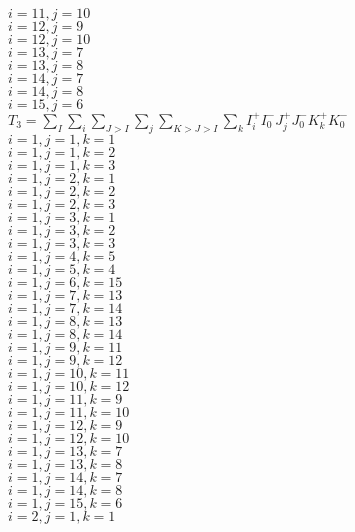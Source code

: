 \documentclass[14pt]{article}
\begin{document}
    $i=11,j=10 $ \\ 
    $i=12,j=9 $ \\ 
    $i=12,j=10 $ \\ 
    $i=13,j=7 $ \\ 
    $i=13,j=8 $ \\ 
    $i=14,j=7 $ \\ 
    $i=14,j=8 $ \\ 
    $i=15,j=6 $ \\ 
    $T_3 = \displaystyle\sum_{I}\displaystyle\sum_i\displaystyle\sum_{J>I}\displaystyle\sum_j\displaystyle\sum_{K>J>I}\displaystyle\sum_k{I_i^+I_0^-J_j^+J_0^-K_k^+K_0^-} $ \\ 
    $i=1,j=1,k=1 $ \\ 
    $i=1,j=1,k=2 $ \\ 
    $i=1,j=1,k=3 $ \\ 
    $i=1,j=2,k=1 $ \\ 
    $i=1,j=2,k=2 $ \\ 
    $i=1,j=2,k=3 $ \\ 
    $i=1,j=3,k=1 $ \\ 
    $i=1,j=3,k=2 $ \\ 
    $i=1,j=3,k=3 $ \\ 
    $i=1,j=4,k=5 $ \\ 
    $i=1,j=5,k=4 $ \\ 
    $i=1,j=6,k=15 $ \\ 
    $i=1,j=7,k=13 $ \\ 
    $i=1,j=7,k=14 $ \\ 
    $i=1,j=8,k=13 $ \\ 
    $i=1,j=8,k=14 $ \\ 
    $i=1,j=9,k=11 $ \\ 
    $i=1,j=9,k=12 $ \\ 
    $i=1,j=10,k=11 $ \\ 
    $i=1,j=10,k=12 $ \\ 
    $i=1,j=11,k=9 $ \\ 
    $i=1,j=11,k=10 $ \\ 
    $i=1,j=12,k=9 $ \\ 
    $i=1,j=12,k=10 $ \\ 
    $i=1,j=13,k=7 $ \\ 
    $i=1,j=13,k=8 $ \\ 
    $i=1,j=14,k=7 $ \\ 
    $i=1,j=14,k=8 $ \\ 
    $i=1,j=15,k=6 $ \\ 
    $i=2,j=1,k=1 $ \\ 
\end{document}
